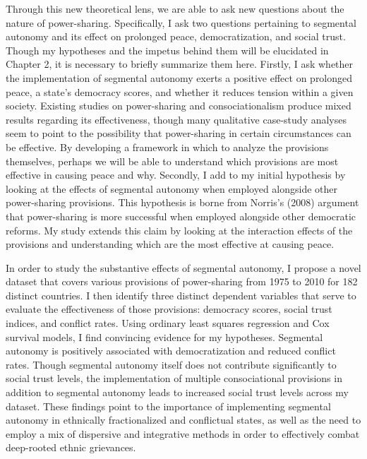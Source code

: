 \documentclass[12pt]{article}
\begin{document}
Through this new theoretical lens, we are able to ask new questions about the nature of power-sharing. Specifically, I ask two questions pertaining to segmental autonomy and its effect on prolonged peace, democratization, and social trust. Though my hypotheses and the impetus behind them will be elucidated in Chapter 2, it is necessary to briefly summarize them here. Firstly, I ask whether the implementation of segmental autonomy exerts a positive effect on prolonged peace, a state’s democracy scores, and whether it reduces tension within a given society. Existing studies on power-sharing and consociationalism produce mixed results regarding its effectiveness, though many qualitative case-study analyses seem to point to the possibility that power-sharing in certain circumstances can be effective. By developing a framework in which to analyze the provisions themselves, perhaps we will be able to understand which provisions are most effective in causing peace and why. Secondly, I add to my initial hypothesis by looking at the effects of segmental autonomy when employed alongside other power-sharing provisions. This hypothesis is borne from Norris’s (2008) argument that power-sharing is more successful when employed alongside other democratic reforms. My study extends this claim by looking at the interaction effects of the provisions and understanding which are the most effective at causing peace.

In order to study the substantive effects of segmental autonomy, I propose a novel dataset that covers various provisions of power-sharing from 1975 to 2010 for 182 distinct countries. I then identify three distinct dependent variables that serve to evaluate the effectiveness of those provisions: democracy scores, social trust indices, and conflict rates. Using ordinary least squares regression and Cox survival models, I find convincing evidence for my hypotheses. Segmental autonomy is positively associated with democratization and reduced conflict rates. Though segmental autonomy itself does not contribute significantly to social trust levels, the implementation of multiple consociational provisions in addition to segmental autonomy leads to increased social trust levels across my dataset. These findings point to the importance of implementing segmental autonomy in ethnically fractionalized and conflictual states, as well as the need to employ a mix of dispersive and integrative methods in order to effectively combat deep-rooted ethnic grievances. 
 
\end{document}
